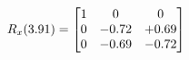 \documentclass[preview]{standalone}
\begin{document}
\begin{align*}
\special{dvisvgm:raw <g id='unique000'>}R_{x}(3.91) = \begin{bmatrix}1 & 0 & 0 \\0 & -0.72 & +0.69 \\0 & -0.69 & -0.72\end{bmatrix}\special{dvisvgm:raw </g>}
\end{align*}
\end{document}
